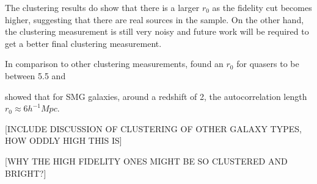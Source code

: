 The clustering results do show that there is a larger $r_0$ as the fidelity cut becomes higher, suggesting that there are real sources in the sample. On the other hand, the clustering measurement is still very noisy and future work will be required to get a better final clustering measurement. 

In comparison to other clustering measurements, \cite{hickox2011clustering} found an $r_0$ for quasers to be between 5.5 and 

\cite{hickox2011clustering} showed that for SMG galaxies, around a redshift of 2, the autocorrelation length $r_0 \approx 6 h^{-1} Mpc$. 

[INCLUDE DISCUSSION OF CLUSTERING OF OTHER GALAXY TYPES, HOW ODDLY HIGH THIS IS]

[WHY THE HIGH FIDELITY ONES MIGHT BE SO CLUSTERED AND BRIGHT?]


